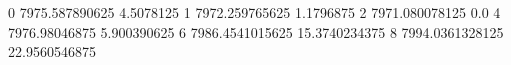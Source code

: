 0 7975.587890625 4.5078125
1 7972.259765625 1.1796875
2 7971.080078125 0.0
4 7976.98046875 5.900390625
6 7986.4541015625 15.3740234375
8 7994.0361328125 22.9560546875
